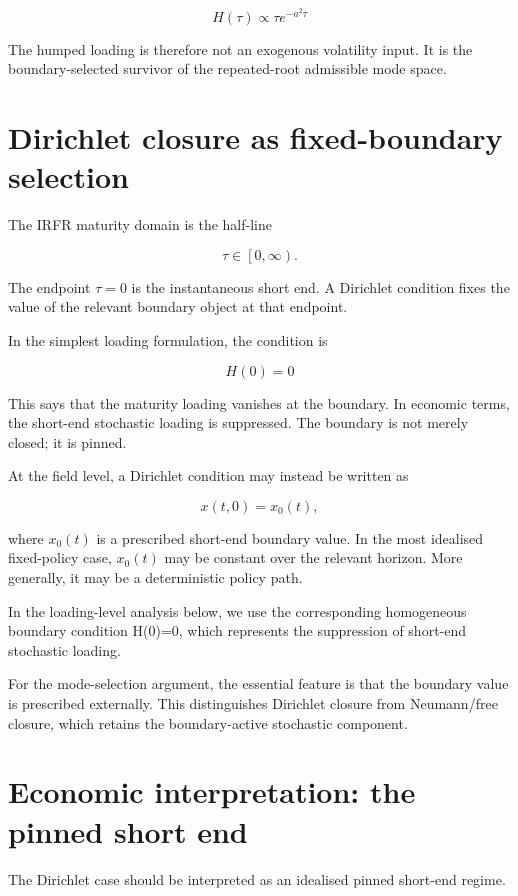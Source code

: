 \documentclass[11pt,oneside]{book}
\begin{document}
\[
H(\tau) \propto \tau e^{-a^2\tau}
\]

The humped loading is therefore not an exogenous volatility input. It is
the boundary-selected survivor of the repeated-root admissible mode
space.

\section{Dirichlet closure as fixed-boundary
selection}\label{dirichlet-closure-as-fixed-boundary-selection}

The IRFR maturity domain is the half-line

\[
\tau \in \left[0,\infty\right).
\]

The endpoint $\tau=0$ is the instantaneous short end. A Dirichlet condition
fixes the value of the relevant boundary object at that endpoint.

In the simplest loading formulation, the condition is

\[
H(0)=0
\]

This says that the maturity loading vanishes at the boundary. In
economic terms, the short-end stochastic loading is suppressed. The
boundary is not merely closed; it is pinned.

At the field level, a Dirichlet condition may instead be written as

\[
x(t,0)=x_0(t),
\]

where $x_0(t)$ is a prescribed short-end boundary value. In the most
idealised fixed-policy case, $x_0(t)$ may be constant over the relevant
horizon. More generally, it may be a deterministic policy path.

In the loading-level analysis below, we use the corresponding
homogeneous boundary condition H(0)=0, which represents the suppression
of short-end stochastic loading.

For the mode-selection argument, the essential feature is that the
boundary value is prescribed externally. This distinguishes Dirichlet
closure from Neumann/free closure, which retains the boundary-active
stochastic component.

\section{Economic interpretation: the pinned short
end}\label{economic-interpretation-the-pinned-short-end}

The Dirichlet case should be interpreted as an idealised pinned
short-end regime.
\end{document}
